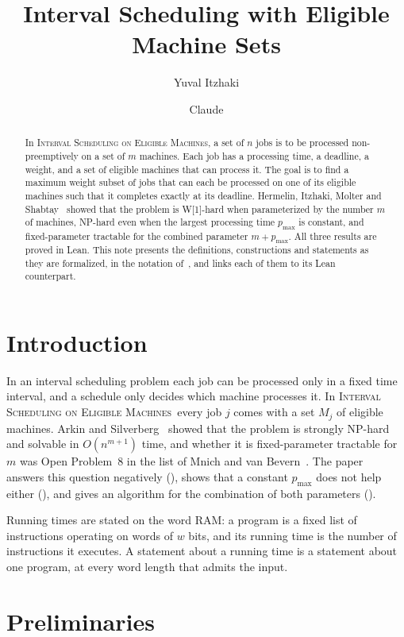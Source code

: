 \documentclass[11pt,a4paper]{article}
\title{Interval Scheduling with Eligible Machine Sets}
\author{Yuval Itzhaki \and Claude}
\date{}
\theoremstyle{definition}
\newcommand{\pmax}{p_{\max}}
\newcommand{\ProbEM}{\textsc{Interval Scheduling on Eligible Machines}}
\newcommand{\bigO}{O}
\newcommand{\Wone}{\textnormal{\textsf{W[1]}}}
\newcommand{\NP}{\textnormal{\textsf{NP}}}
\begin{document}
\maketitle

\begin{abstract}
In \ProbEM, a set of $n$ jobs is to be processed non-preemptively on a set of $m$ machines.
Each job has a processing time, a deadline, a weight, and a set of eligible machines that
can process it. The goal is to find a maximum weight subset of jobs that can each be
processed on one of its eligible machines such that it completes exactly at its deadline.
Hermelin, Itzhaki, Molter and Shabtay~\cite{HIMS24} showed that the problem is \Wone-hard
when parameterized by the number $m$ of machines, \NP-hard even when the largest processing
time $\pmax$ is constant, and fixed-parameter tractable for the combined parameter
$m+\pmax$. All three results are proved in Lean. This note presents the definitions,
constructions and statements as they are formalized, in the notation of~\cite{HIMS24}, and
links each of them to its Lean counterpart.
\end{abstract}

\section{Introduction}

In an interval scheduling problem each job can be processed only in a fixed time interval,
and a schedule only decides which machine processes it. In \ProbEM\ every job $j$ comes
with a set $M_j$ of eligible machines. Arkin and Silverberg~\cite{AS87} showed that the
problem is strongly \NP-hard and solvable in $\bigO(n^{m+1})$ time, and whether it is
fixed-parameter tractable for $m$ was Open Problem~8 in the list of Mnich and van
Bevern~\cite{MvB18}. The paper~\cite{HIMS24} answers this question negatively
(), shows that a constant $\pmax$ does not help either (),
and gives an algorithm for the combination of both parameters ().

Running times are stated on the word RAM: a program is a fixed list of instructions
operating on words of $w$ bits, and its running time is the number of instructions it
executes. A statement about a running time is a statement about one program, at every word
length that admits the input.

\section{Preliminaries}\label{sec:0}
\end{document}
